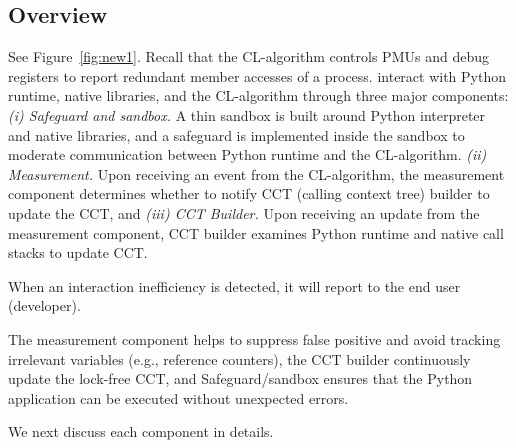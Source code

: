 \subsection{Overview}
See Figure~\ref{fig:new1}. Recall that the CL-algorithm controls PMUs and debug registers to report redundant member accesses of a process. \tool interact with Python runtime, native libraries, and the CL-algorithm through three major components: \emph{(i) Safeguard and sandbox.} A thin sandbox is built around Python interpreter and native libraries, and a safeguard is implemented inside the sandbox to moderate communication between Python runtime and the CL-algorithm. \emph{(ii) Measurement.} Upon receiving an event from the CL-algorithm, the measurement component determines whether to notify CCT (calling context tree) builder to update the CCT, and \emph{(iii) CCT Builder.} Upon receiving an update from the measurement component, CCT builder examines Python runtime and native call stacks to update CCT. 

When an interaction inefficiency is detected, it will report to the end user (developer). 

The measurement component helps to suppress false positive and avoid tracking irrelevant variables (e.g., reference counters), the CCT builder continuously update the lock-free CCT, and Safeguard/sandbox ensures that the Python application can be executed without unexpected errors. 

We next discuss each component in details. 



